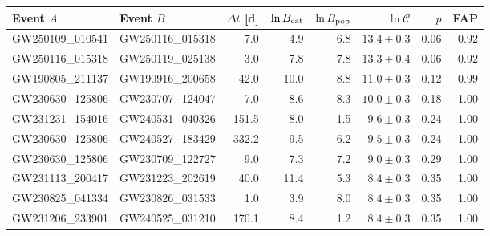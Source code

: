 \begin{tabular}{llrrrrrr}
\toprule
Event $A$ & Event $B$ & $\Delta t$ [d] & $\ln B_{\rm cat}$ & $\ln B_{\rm pop}$ & $\ln\mathcal C$ & $p$ & FAP \\
\midrule
GW250109\_010541 & GW250116\_015318 & 7.0 & 4.9 & 6.8 & $13.4\pm0.3$ & 0.06 & 0.92 \\
GW250116\_015318 & GW250119\_025138 & 3.0 & 7.8 & 7.8 & $13.3\pm0.4$ & 0.06 & 0.92 \\
GW190805\_211137 & GW190916\_200658 & 42.0 & 10.0 & 8.8 & $11.0\pm0.3$ & 0.12 & 0.99 \\
GW230630\_125806 & GW230707\_124047 & 7.0 & 8.6 & 8.3 & $10.0\pm0.3$ & 0.18 & 1.00 \\
GW231231\_154016 & GW240531\_040326 & 151.5 & 8.0 & 1.5 & $9.6\pm0.3$ & 0.24 & 1.00 \\
GW230630\_125806 & GW240527\_183429 & 332.2 & 9.5 & 6.2 & $9.5\pm0.3$ & 0.24 & 1.00 \\
GW230630\_125806 & GW230709\_122727 & 9.0 & 7.3 & 7.2 & $9.0\pm0.3$ & 0.29 & 1.00 \\
GW231113\_200417 & GW231223\_202619 & 40.0 & 11.4 & 5.3 & $8.4\pm0.3$ & 0.35 & 1.00 \\
GW230825\_041334 & GW230826\_031533 & 1.0 & 3.9 & 8.0 & $8.4\pm0.3$ & 0.35 & 1.00 \\
GW231206\_233901 & GW240525\_031210 & 170.1 & 8.4 & 1.2 & $8.4\pm0.3$ & 0.35 & 1.00 \\
\bottomrule
\end{tabular}
